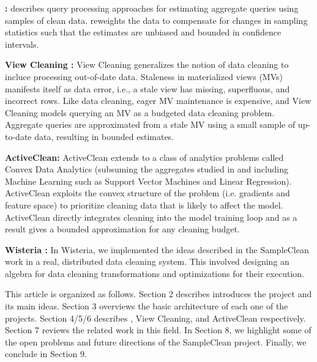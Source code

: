 \vspace{0.5em}
\noindent \textbf{\sampleclean \cite{wang1999sample}: } \sampleclean describes query processing approaches for estimating aggregate queries using samples of clean data. \sampleclean reweights the data to compensate for changes in sampling statistics such that the estimates are unbiased and bounded in confidence intervals.

\vspace{0.5em}
\noindent \textbf{View Cleaning \cite{krishnan2015svc}: } View Cleaning generalizes the notion of data cleaning to incluce processing out-of-date data. Staleness in materialized views (MVs) manifests itself as data error, i.e., a stale view has missing, superfluous, and incorrect rows.
Like data cleaning, eager MV maintenance is expensive, and View Cleaning models querying an MV as a budgeted data cleaning problem.
Aggregate queries are approximated from a stale MV using a small sample of up-to-date data, resulting in bounded estimates.

\vspace{0.5em}
\noindent \textbf{ActiveClean: } ActiveClean extends \sampleclean to a class of analytics problems called Convex Data Analytics (subsuming the aggregates studied in \sampleclean and including Machine Learning such as Support Vector Machines and Linear Regression). ActiveClean exploits the convex structure of the problem (i.e. gradients and feature space) to prioritize cleaning data that is likely to affect the model. ActiveClean directly integrates cleaning into the model training loop and as a result gives a bounded approximation for any cleaning budget.

\vspace{0.5em}
\noindent \textbf{Wisteria \cite{haas2015wisteria}: } In Wisteria, we implemented the ideas described in the SampleClean work in a real, distributed data cleaning system. This involved designing an algebra for data cleaning transformations and optimizations for their execution.

This article is organized as follows. Section 2 describes introduces the project and its main ideas. Section 3 overviews the basic architecture of each one of the projects. Section 4/5/6 describes \sampleclean, View Cleaning, and ActiveClean respectively. Section 7 reviews the related work in this field. In Section 8, we highlight some of the open problems and future directions of the SampleClean project. Finally, we conclude in Section 9.